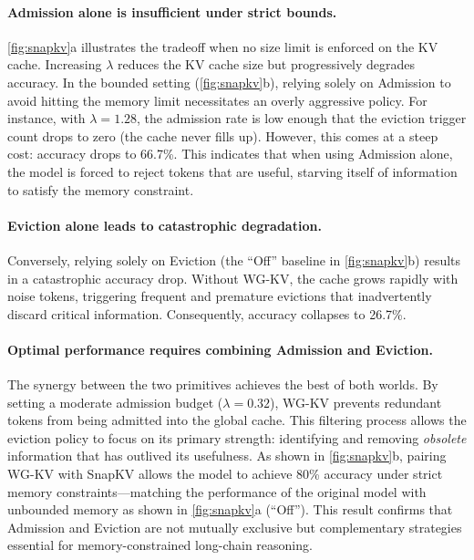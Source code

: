 \paragraph{Admission alone is insufficient under strict bounds.}
\cref{fig:snapkv}a illustrates the tradeoff when no size limit is enforced on the KV cache. Increasing $\lambda$ reduces the KV cache size but progressively degrades accuracy.
In the bounded setting (\cref{fig:snapkv}b), relying solely on Admission to avoid hitting the memory limit necessitates an overly aggressive policy. For instance, with $\lambda=1.28$, the admission rate is low enough that the eviction trigger count drops to zero (the cache never fills up). However, this comes at a steep cost: accuracy drops to 66.7\%. This indicates that when using Admission alone, the model is forced to reject tokens that are useful, starving itself of information to satisfy the memory constraint.

\paragraph{Eviction alone leads to catastrophic degradation.}
Conversely, relying solely on Eviction (the ``Off'' baseline in \cref{fig:snapkv}b) results in a catastrophic accuracy drop. Without WG-KV, the cache grows rapidly with noise tokens, triggering frequent and premature evictions that inadvertently discard critical information. Consequently, accuracy collapses to 26.7\%.

\paragraph{Optimal performance requires combining Admission and Eviction.}
The synergy between the two primitives achieves the best of both worlds. By setting a moderate admission budget ($\lambda=0.32$), WG-KV prevents redundant tokens from being admitted into the global cache. This filtering process allows the eviction policy to focus on its primary strength: identifying and removing \textit{obsolete} information that has outlived its usefulness. As shown in \cref{fig:snapkv}b, pairing WG-KV with SnapKV allows the model to achieve 80\% accuracy under strict memory constraints---matching the performance of the original model with unbounded memory as shown in \cref{fig:snapkv}a (``Off''). This result confirms that Admission and Eviction are not mutually exclusive but complementary strategies essential for memory-constrained long-chain reasoning.

